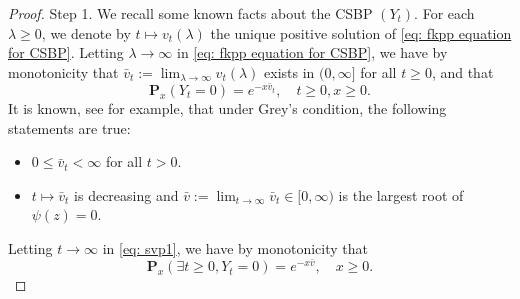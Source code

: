 \documentclass[12pt,a4paper]{amsart}
\theoremstyle{plain}
\theoremstyle{definition}
\numberwithin{equation}{section}
\begin{document}
\begin{proof}
    Step 1. We recall some known facts about the CSBP $(Y_t)$.
    For each $\lambda \geq 0$, we denote by $t\mapsto v_t(\lambda)$ the unique positive solution of \eqref{eq: fkpp equation for CSBP}. 
    Letting $\lambda \to \infty$ in \eqref{eq: fkpp equation for CSBP}, we have by monotonicity that $\bar v_t:= \lim_{\lambda \to \infty}v_t(\lambda)$ exists in $(0,\infty]$ for all $t\geq 0$, and that
\begin{equation}
\label{eq: svp1}
    \mathbf P_x(Y_t = 0)=e^{-x\bar v_t}, \quad t\geq 0, x\ge 0.
\end{equation}
    It is known, see \cite[Theorem 3.5-3.8]{Li2011Measure-valued} for example, that under Grey's condition, the following statements are true:
\begin{itemize}
\item
    $0\leq \bar v_t < \infty$ for all $t>0$.
\item
    $t\mapsto \bar v_t$ is decreasing and $\bar v:= \lim_{t\to \infty} \bar v_t \in [0,\infty)$ is the largest root of $\psi(z) = 0$.
\end{itemize}
    Letting $t \to \infty$ in \eqref{eq: svp1}, we have by monotonicity that
\[
    \mathbf P_x(\exists t \geq 0, Y_t = 0)
    = e^{-x\bar v}, \quad x\geq 0.
\]


\end{proof}
\end{document}
